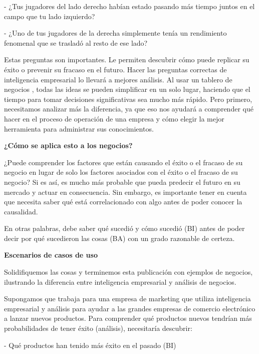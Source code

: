 \begin{flushleft}
\item 
- ¿Tus jugadores del lado derecho habían estado pasando más tiempo juntos en el campo que tu lado izquierdo?
\item 
- ¿Uno de tus jugadores de la derecha simplemente tenía un rendimiento fenomenal que se trasladó al resto de ese lado?
\item 
\item 
Estas preguntas son importantes. Le permiten descubrir cómo puede replicar su éxito o prevenir su fracaso en el futuro. Hacer las preguntas  correctas de inteligencia empresarial  lo llevará a mejores análisis. Al usar un tablero de negocios , todas las ideas se pueden simplificar en un solo lugar, haciendo que el tiempo para tomar decisiones significativas sea mucho más rápido. Pero primero, necesitamos analizar más la diferencia, ya que eso nos ayudará a comprender qué hacer en el proceso de operación de una empresa y cómo elegir la mejor herramienta para administrar sus conocimientos.
\item 
\textbf{¿Cómo se aplica esto a los negocios?}\\
\item 
¿Puede comprender los factores que están  causando  el éxito o el fracaso de su negocio en lugar de solo los factores  asociados  con el éxito o el fracaso de su negocio? Si es así, es mucho más probable que pueda predecir el futuro en su mercado y actuar en consecuencia. Sin embargo, es importante tener en cuenta que necesita saber qué está correlacionado con algo antes de poder conocer la causalidad.
\item
En otras palabras, debe saber  qué  sucedió y  cómo  sucedió (BI) antes de poder decir  por qué  sucedieron las cosas (BA) con un grado razonable de certeza.
\item
\item
\textbf{Escenarios de casos de uso}\\
\item
Solidifiquemos las cosas y terminemos esta publicación con ejemplos de negocios, ilustrando la diferencia entre inteligencia empresarial y análisis de negocios.
\item
Supongamos que trabaja para una empresa de marketing que utiliza inteligencia empresarial y análisis para ayudar a las grandes empresas de comercio electrónico a lanzar nuevos productos. Para comprender qué productos nuevos tendrían más probabilidades de tener éxito (análisis), necesitaría descubrir:
\item 
- Qué productos han tenido más éxito en el pasado (BI)

\end{flushleft}
